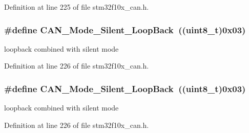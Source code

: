 Definition at line 225 of file stm32f10x\+\_\+can.\+h.

\subsubsection[{\texorpdfstring{C\+A\+N\+\_\+\+Mode\+\_\+\+Silent\+\_\+\+Loop\+Back}{CAN_Mode_Silent_LoopBack}}]{\setlength{\rightskip}{0pt plus 5cm}\#define C\+A\+N\+\_\+\+Mode\+\_\+\+Silent\+\_\+\+Loop\+Back~(({\bf uint8\+\_\+t})0x03)}\hypertarget{group___c_a_n___mode_ga087afa0d24d2cf399225993573c984eb}{}\label{group___c_a_n___mode_ga087afa0d24d2cf399225993573c984eb}
loopback combined with silent mode 

Definition at line 226 of file stm32f10x\+\_\+can.\+h.

\subsubsection[{\texorpdfstring{C\+A\+N\+\_\+\+Mode\+\_\+\+Silent\+\_\+\+Loop\+Back}{CAN_Mode_Silent_LoopBack}}]{\setlength{\rightskip}{0pt plus 5cm}\#define C\+A\+N\+\_\+\+Mode\+\_\+\+Silent\+\_\+\+Loop\+Back~(({\bf uint8\+\_\+t})0x03)}\hypertarget{group___c_a_n___mode_ga087afa0d24d2cf399225993573c984eb}{}\label{group___c_a_n___mode_ga087afa0d24d2cf399225993573c984eb}
loopback combined with silent mode 

Definition at line 226 of file stm32f10x\+\_\+can.\+h.

